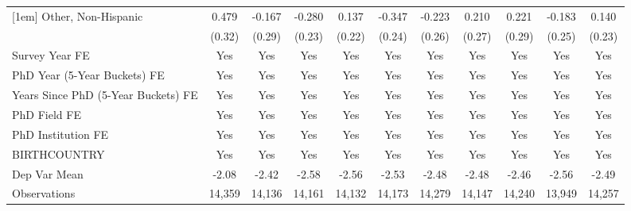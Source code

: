 \begin{table}[htbp]
\begin{tabular}{l*{10}{c}}
[1em]
Other, Non-Hispanic&       0.479         &      -0.167         &      -0.280         &       0.137         &      -0.347         &      -0.223         &       0.210         &       0.221         &      -0.183         &       0.140         \\
  &      (0.32)         &      (0.29)         &      (0.23)         &      (0.22)         &      (0.24)         &      (0.26)         &      (0.27)         &      (0.29)         &      (0.25)         &      (0.23)         \\
[1em]
Survey Year FE&         Yes         &         Yes         &         Yes         &         Yes         &         Yes         &         Yes         &         Yes         &         Yes         &         Yes         &         Yes         \\
[1em]
PhD Year (5-Year Buckets) FE&         Yes         &         Yes         &         Yes         &         Yes         &         Yes         &         Yes         &         Yes         &         Yes         &         Yes         &         Yes         \\
[1em]
Years Since PhD (5-Year Buckets) FE&         Yes         &         Yes         &         Yes         &         Yes         &         Yes         &         Yes         &         Yes         &         Yes         &         Yes         &         Yes         \\
[1em]
PhD Field FE&         Yes         &         Yes         &         Yes         &         Yes         &         Yes         &         Yes         &         Yes         &         Yes         &         Yes         &         Yes         \\
[1em]
PhD Institution FE&         Yes         &         Yes         &         Yes         &         Yes         &         Yes         &         Yes         &         Yes         &         Yes         &         Yes         &         Yes         \\
[1em]
BIRTHCOUNTRY&         Yes         &         Yes         &         Yes         &         Yes         &         Yes         &         Yes         &         Yes         &         Yes         &         Yes         &         Yes         \\
\hline
Dep Var Mean&       -2.08         &       -2.42         &       -2.58         &       -2.56         &       -2.53         &       -2.48         &       -2.48         &       -2.46         &       -2.56         &       -2.49         \\
Observations&      14,359         &      14,136         &      14,161         &      14,132         &      14,173         &      14,279         &      14,147         &      14,240         &      13,949         &      14,257         \\

\end{tabular}
\end{table}
